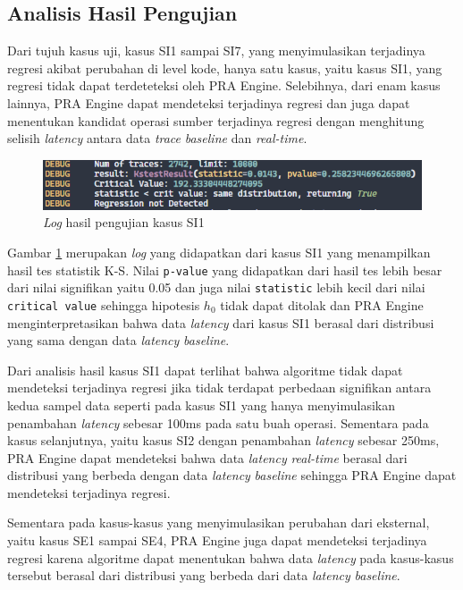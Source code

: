 \subsection{Analisis Hasil Pengujian}
Dari tujuh kasus uji, kasus SI1 sampai SI7, yang menyimulasikan terjadinya regresi akibat perubahan di level kode, hanya satu kasus, yaitu kasus SI1, yang regresi tidak dapat terdeteteksi oleh PRA Engine. Selebihnya, dari enam kasus lainnya, PRA Engine dapat mendeteksi terjadinya regresi dan juga dapat menentukan kandidat operasi sumber terjadinya regresi dengan menghitung selisih \textit{latency} antara data \textit{trace} \textit{baseline} dan \textit{real-time}. 

\begin{figure}[!htb]
	\centering
	\includegraphics[width=1\textwidth]{resources/ch4/log/1-log.png}
	\caption{\textit{Log} hasil pengujian kasus SI1}
	\label{result_log_1}
\end{figure}

Gambar \ref{result_log_1} merupakan \textit{log} yang didapatkan dari kasus SI1 yang menampilkan hasil tes statistik K-S. Nilai \texttt{p-value} yang didapatkan dari hasil tes lebih besar dari nilai signifikan yaitu 0.05 dan juga nilai \texttt{statistic} lebih kecil dari nilai \texttt{critical value} sehingga hipotesis $h_{0}$ tidak dapat ditolak dan PRA Engine menginterpretasikan bahwa data \textit{latency} dari kasus SI1 berasal dari distribusi yang sama dengan data \textit{latency} \textit{baseline}. 

Dari analisis hasil kasus SI1 dapat terlihat bahwa algoritme tidak dapat mendeteksi terjadinya regresi jika tidak terdapat perbedaan signifikan antara kedua sampel data seperti pada kasus SI1 yang hanya menyimulasikan penambahan \textit{latency} sebesar 100ms pada satu buah operasi. Sementara pada kasus selanjutnya, yaitu kasus SI2 dengan penambahan \textit{latency} sebesar 250ms, PRA Engine dapat mendeteksi bahwa data \textit{latency} \textit{real-time} berasal dari distribusi yang berbeda dengan data \textit{latency} \textit{baseline} sehingga PRA Engine dapat mendeteksi terjadinya regresi.

Sementara pada kasus-kasus yang menyimulasikan perubahan dari eksternal, yaitu kasus SE1 sampai SE4, PRA Engine juga dapat mendeteksi terjadinya regresi karena algoritme dapat menentukan bahwa data \textit{latency} pada kasus-kasus tersebut berasal dari distribusi yang berbeda dari data \textit{latency} \textit{baseline}.

